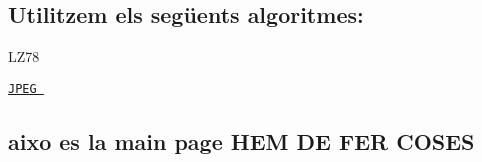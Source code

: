 \subsection*{Utilitzem els següents algoritmes\+:}


\begin{DoxyEnumerate}
\item L\+Z78
\item \href{./classdomini_1_1algorithm_1_1JPEG.html}{\tt J\+P\+EG }
\end{DoxyEnumerate}

\subsection*{aixo es la main page H\+EM DE F\+ER C\+O\+S\+ES}